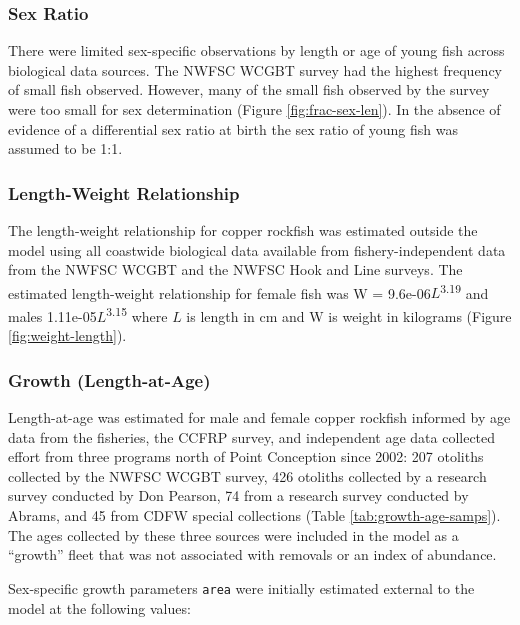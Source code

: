 \documentclass[11pt,
  english,
  letterpaper,
]{article}
\begin{document}
\hypertarget{sex-ratio}{%
\subsubsection{Sex Ratio}\label{sex-ratio}}

There were limited sex-specific observations by length or age of young fish across biological data sources. The NWFSC WCGBT survey had the highest frequency of small fish observed. However, many of the small fish observed by the survey were too small for sex determination (Figure \ref{fig:frac-sex-len}). In the absence of evidence of a differential sex ratio at birth the sex ratio of young fish was assumed to be 1:1.

\hypertarget{length-weight-relationship}{%
\subsubsection{Length-Weight Relationship}\label{length-weight-relationship}}

The length-weight relationship for copper rockfish was estimated outside the model using all coastwide biological data available from fishery-independent data from the NWFSC WCGBT and the NWFSC Hook and Line surveys. The estimated length-weight relationship for female fish was W = 9.6e-06\(L\)\textsuperscript{3.19} and males 1.11e-05\(L\)\textsuperscript{3.15} where \(L\) is length in cm and W is weight in kilograms (Figure \ref{fig:weight-length}).

\hypertarget{length-at-age}{%
\subsubsection{Growth (Length-at-Age)}\label{length-at-age}}

Length-at-age was estimated for male and female copper rockfish informed by age data from the fisheries, the CCFRP survey, and independent age data collected effort from three programs north of Point Conception since 2002: 207 otoliths collected by the NWFSC WCGBT survey, 426 otoliths collected by a research survey conducted by Don Pearson, 74 from a research survey conducted by Abrams, and 45 from CDFW special collections (Table \ref{tab:growth-age-samps}). The ages collected by these three sources were included in the model as a ``growth'' fleet that was not associated with removals or an index of abundance.

Sex-specific growth parameters \texttt{area} were initially estimated external to the model at the following values:
\end{document}
